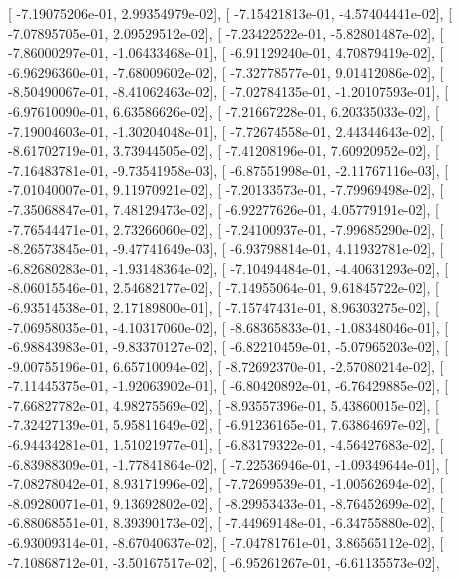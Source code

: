 \documentclass{article}
\begin{document}
       [ -7.19075206e-01,   2.99354979e-02],
       [ -7.15421813e-01,  -4.57404441e-02],
       [ -7.07895705e-01,   2.09529512e-02],
       [ -7.23422522e-01,  -5.82801487e-02],
       [ -7.86000297e-01,  -1.06433468e-01],
       [ -6.91129240e-01,   4.70879419e-02],
       [ -6.96296360e-01,  -7.68009602e-02],
       [ -7.32778577e-01,   9.01412086e-02],
       [ -8.50490067e-01,  -8.41062463e-02],
       [ -7.02784135e-01,  -1.20107593e-01],
       [ -6.97610090e-01,   6.63586626e-02],
       [ -7.21667228e-01,   6.20335033e-02],
       [ -7.19004603e-01,  -1.30204048e-01],
       [ -7.72674558e-01,   2.44344643e-02],
       [ -8.61702719e-01,   3.73944505e-02],
       [ -7.41208196e-01,   7.60920952e-02],
       [ -7.16483781e-01,  -9.73541958e-03],
       [ -6.87551998e-01,  -2.11767116e-03],
       [ -7.01040007e-01,   9.11970921e-02],
       [ -7.20133573e-01,  -7.79969498e-02],
       [ -7.35068847e-01,   7.48129473e-02],
       [ -6.92277626e-01,   4.05779191e-02],
       [ -7.76544471e-01,   2.73266060e-02],
       [ -7.24100937e-01,  -7.99685290e-02],
       [ -8.26573845e-01,  -9.47741649e-03],
       [ -6.93798814e-01,   4.11932781e-02],
       [ -6.82680283e-01,  -1.93148364e-02],
       [ -7.10494484e-01,  -4.40631293e-02],
       [ -8.06015546e-01,   2.54682177e-02],
       [ -7.14955064e-01,   9.61845722e-02],
       [ -6.93514538e-01,   2.17189800e-01],
       [ -7.15747431e-01,   8.96303275e-02],
       [ -7.06958035e-01,  -4.10317060e-02],
       [ -8.68365833e-01,  -1.08348046e-01],
       [ -6.98843983e-01,  -9.83370127e-02],
       [ -6.82210459e-01,  -5.07965203e-02],
       [ -9.00755196e-01,   6.65710094e-02],
       [ -8.72692370e-01,  -2.57080214e-02],
       [ -7.11445375e-01,  -1.92063902e-01],
       [ -6.80420892e-01,  -6.76429885e-02],
       [ -7.66827782e-01,   4.98275569e-02],
       [ -8.93557396e-01,   5.43860015e-02],
       [ -7.32427139e-01,   5.95811649e-02],
       [ -6.91236165e-01,   7.63864697e-02],
       [ -6.94434281e-01,   1.51021977e-01],
       [ -6.83179322e-01,  -4.56427683e-02],
       [ -6.83988309e-01,  -1.77841864e-02],
       [ -7.22536946e-01,  -1.09349644e-01],
       [ -7.08278042e-01,   8.93171996e-02],
       [ -7.72699539e-01,  -1.00562694e-02],
       [ -8.09280071e-01,   9.13692802e-02],
       [ -8.29953433e-01,  -8.76452699e-02],
       [ -6.88068551e-01,   8.39390173e-02],
       [ -7.44969148e-01,  -6.34755880e-02],
       [ -6.93009314e-01,  -8.67040637e-02],
       [ -7.04781761e-01,   3.86565112e-02],
       [ -7.10868712e-01,  -3.50167517e-02],
       [ -6.95261267e-01,  -6.61135573e-02],
\end{document}
